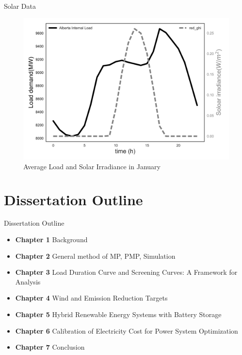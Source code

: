 \documentclass[newPxFont,numfooter,progressbar,sectionpages]{beamer}
\begin{document}

\begin{frame}[c]{Solar Data}

\begin{figure}
	\centering
	\includegraphics[width=0.9\linewidth]{"figure/load_rad"}
	\caption{Average Load and Solar Irradiance in January}
	\label{fig:load_rad}
\end{figure}



\end{frame}


%
%
\section{Dissertation Outline}



\begin{frame}[c]{Dissertation Outline}


\begin{itemize}
	\item \textbf{Chapter 1} Background
	\item \textbf{Chapter 2} General method of MP, PMP, Simulation
	\item \textbf{Chapter 3} Load Duration Curve and Screening Curves: A Framework for Analysis
	\item \textbf{Chapter 4} Wind and Emission Reduction Targets
	\item \textbf{Chapter 5} Hybrid Renewable Energy Systems with Battery Storage
	\item \textbf{Chapter 6} Calibration of Electricity Cost for Power System Optimization
	\item \textbf{Chapter 7} Conclusion


\end{itemize}

\end{frame}
\end{document}
